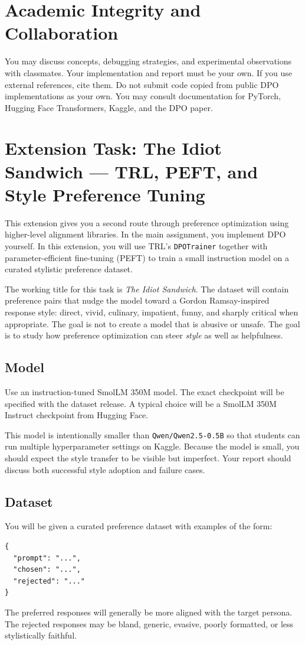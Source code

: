 \documentclass[11pt]{article}
\newcommand{\modelname}{\texttt{Qwen/Qwen2.5-0.5B}}
\begin{document}
\section{Academic Integrity and Collaboration}
You may discuss concepts, debugging strategies, and experimental observations with classmates. Your implementation and report must be your own. If you use external references, cite them. Do not submit code copied from public DPO implementations as your own. You may consult documentation for PyTorch, Hugging Face Transformers, Kaggle, and the DPO paper.

\section{Extension Task: The Idiot Sandwich --- TRL, PEFT, and Style Preference Tuning}

This extension gives you a second route through preference optimization using higher-level alignment libraries. In the main assignment, you implement DPO yourself. In this extension, you will use TRL's \texttt{DPOTrainer} together with parameter-efficient fine-tuning (PEFT) to train a small instruction model on a curated stylistic preference dataset.

The working title for this task is \emph{The Idiot Sandwich}. The dataset will contain preference pairs that nudge the model toward a Gordon Ramsay-inspired response style: direct, vivid, culinary, impatient, funny, and sharply critical when appropriate. The goal is not to create a model that is abusive or unsafe. The goal is to study how preference optimization can steer \emph{style} as well as helpfulness.

\subsection{Model}
Use an instruction-tuned SmolLM 350M model. The exact checkpoint will be specified with the dataset release. A typical choice will be a SmolLM 350M Instruct checkpoint from Hugging Face.

This model is intentionally smaller than \modelname{} so that students can run multiple hyperparameter settings on Kaggle. Because the model is small, you should expect the style transfer to be visible but imperfect. Your report should discuss both successful style adoption and failure cases.

\subsection{Dataset}
You will be given a curated preference dataset with examples of the form:
\begin{lstlisting}
{
  "prompt": "...",
  "chosen": "...",
  "rejected": "..."
}
\end{lstlisting}
The preferred responses will generally be more aligned with the target persona. The rejected responses may be bland, generic, evasive, poorly formatted, or less stylistically faithful.
\end{document}
